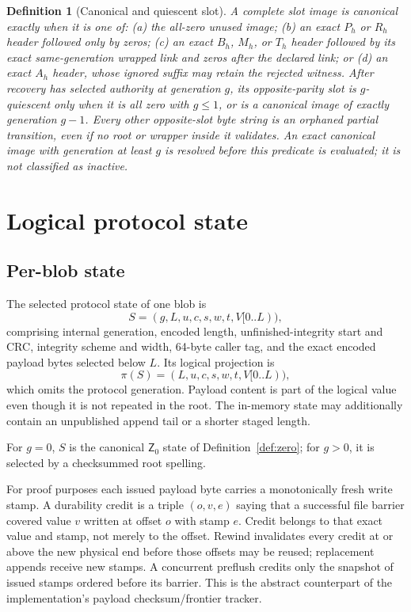 \documentclass[10pt,twocolumn]{article}
\newtheorem{definition}{Definition}
\theoremstyle{remark}
\newcommand{\Zero}{\mathsf{Z}}
\begin{document}
\begin{definition}[Canonical and quiescent slot]\label{def:quiescent}
A complete slot image is canonical exactly when it is one of: (a) the all-zero unused image;
(b) an exact $P_h$ or $R_h$ header followed only by zeros; (c) an exact $B_h$, $M_h$, or $T_h$
header followed by its exact same-generation wrapped link and zeros after the declared link; or
(d) an exact $A_h$ header, whose ignored suffix may retain the rejected witness. After
recovery has selected authority at generation $g$, its opposite-parity slot is
$g$-\emph{quiescent} only when it is all zero with $g\le 1$, or is a canonical image of exactly
generation $g-1$.
Every other opposite-slot byte string is an orphaned partial transition, even if no root or wrapper
inside it validates. An exact canonical image with generation at least $g$ is resolved before this
predicate is evaluated; it is not classified as inactive.
\end{definition}

\section{Logical protocol state}

\subsection{Per-blob state}\label{sec:blob-state}

The selected protocol state of one blob is
\[
  S=(g,L,u,c,s,w,t,V[0..L)),
\]
comprising internal generation, encoded length, unfinished-integrity start and CRC, integrity scheme
and width, 64-byte caller tag, and the exact encoded payload bytes selected below $L$. Its logical
projection is
\[
  \pi(S)=(L,u,c,s,w,t,V[0..L)),
\]
which omits the protocol generation. Payload content is part of the logical value even though it is
not repeated in the root. The in-memory state may
additionally contain an unpublished append tail or a shorter staged length.

For $g=0$, $S$ is the canonical $\Zero_0$ state of Definition~\ref{def:zero}; for $g>0$, it is
selected by a checksummed root spelling.

For proof purposes each issued payload byte carries a monotonically fresh write stamp. A durability
credit is a triple $(o,v,e)$ saying that a successful file barrier covered value $v$ written at
offset $o$ with stamp $e$. Credit belongs to that exact value and stamp, not merely to the offset.
Rewind invalidates every credit at or above the new physical end before those offsets may be reused;
replacement appends receive new stamps. A concurrent preflush credits only the snapshot of issued
stamps ordered before its barrier. This is the abstract counterpart of the implementation's payload
checksum/frontier tracker.
\end{document}
